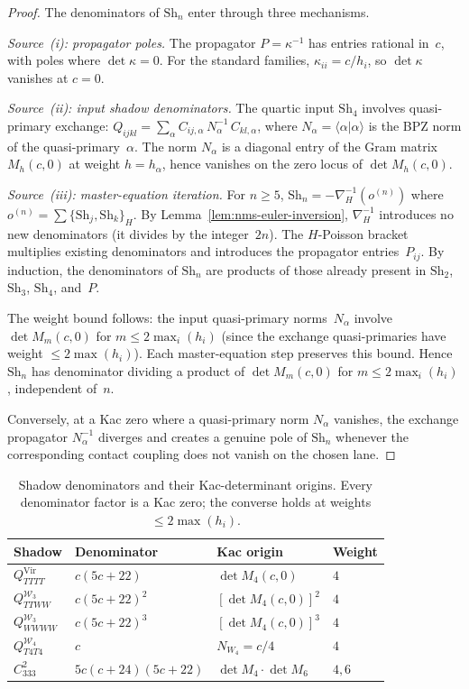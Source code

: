 \begin{proof}
The denominators of $\mathrm{Sh}_n$ enter through three mechanisms.

\emph{Source~(i): propagator poles.}
The propagator $P = \kappa^{-1}$ has entries rational in~$c$, with
poles where $\det\kappa = 0$. For the standard families,
$\kappa_{ii} = c/h_i$, so $\det\kappa$ vanishes at $c = 0$.

\emph{Source~(ii): input shadow denominators.}
The quartic input $\mathrm{Sh}_4$ involves quasi-primary exchange:
$Q_{ijkl} = \sum_\alpha C_{ij,\alpha}\,N_\alpha^{-1}\,C_{kl,\alpha}$,
where $N_\alpha = \langle \alpha | \alpha \rangle$ is the BPZ norm
of the quasi-primary~$\alpha$.
The norm $N_\alpha$ is a diagonal entry of the Gram matrix
$M_h(c,0)$ at weight $h = h_\alpha$, hence vanishes on the zero locus
of $\det M_h(c,0)$.

\emph{Source~(iii): master-equation iteration.}
For $n \geq 5$, $\mathrm{Sh}_n = -\nabla_H^{-1}(o^{(n)})$ where
$o^{(n)} = \sum \{\mathrm{Sh}_j, \mathrm{Sh}_k\}_H$. By
Lemma~\ref{lem:nms-euler-inversion}, $\nabla_H^{-1}$ introduces no
new denominators (it divides by the integer~$2n$). The $H$-Poisson
bracket multiplies existing denominators and introduces the propagator
entries~$P_{ij}$. By induction, the denominators of $\mathrm{Sh}_n$
are products of those already present in $\mathrm{Sh}_2$, $\mathrm{Sh}_3$,
$\mathrm{Sh}_4$, and~$P$.

The weight bound follows: the input quasi-primary norms~$N_\alpha$ involve
$\det M_m(c,0)$ for $m \leq 2\max_i(h_i)$
(since the exchange quasi-primaries have weight $\leq 2\max(h_i)$).
Each master-equation step preserves this bound.
Hence $\mathrm{Sh}_n$ has denominator dividing a product of
$\det M_m(c,0)$ for $m \leq 2\max_i(h_i)$, independent of~$n$.

Conversely, at a Kac zero where a quasi-primary norm $N_\alpha$
vanishes, the exchange propagator $N_\alpha^{-1}$ diverges and creates
a genuine pole of $\mathrm{Sh}_n$ whenever the corresponding contact
coupling does not vanish on the chosen lane.
\end{proof}

\begin{table}[ht]
\centering
\caption{Shadow denominators and their Kac-determinant origins.
 Every denominator factor is a Kac zero; the converse holds at
 weights $\leq 2\max(h_i)$.}
\label{tab:nms-kac-shadow-denominators}
\begin{tabular}{llll}
\toprule
Shadow & Denominator & Kac origin & Weight \\
\midrule
$Q_{TTTT}^{\mathrm{Vir}}$
 & $c(5c+22)$ & $\det M_4(c,0)$ & $4$ \\
$Q_{TTWW}^{\mathcal{W}_3}$
 & $c(5c+22)^2$ & $[\det M_4(c,0)]^2$ & $4$ \\
$Q_{WWWW}^{\mathcal{W}_3}$
 & $c(5c+22)^3$ & $[\det M_4(c,0)]^3$ & $4$ \\
$Q_{T4T4}^{\mathcal{W}_4}$
 & $c$ & $N_{W_4} = c/4$ & $4$ \\
$C_{333}^2$
 & $5c(c+24)(5c+22)$
 & $\det M_4 \cdot \det M_6$ & $4,6$ \\
\bottomrule
\end{tabular}
\end{table}

